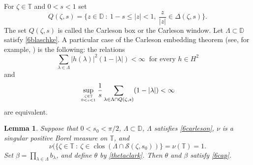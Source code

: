 \documentclass[a4paper,oneside,11pt]{amsart}
\numberwithin{equation}{section}
\theoremstyle{plain}
\newtheorem{lemma}[theorem]{Lemma}
\theoremstyle{definition}
\begin{document}
For $\zeta\in\mathbb T$ and  $0<s<1$ set
\begin{equation*} Q(\zeta, s)=\{z\in\mathbb D\ :\ 1-s\leq |z|<1, \ \frac{z}{|z|}\in\Delta(\zeta, s)\}.
\end{equation*} 
The set $Q(\zeta, s)$ is called the Carleson box or the Carleson window. Let $\Lambda\subset\mathbb D$ satisfy \eqref{6blaschke}.
A particular case of the Carleson embedding theorem 
(see, for example, {\cite[Theorem 11.22]{gmr}}) is the following: the relations 
\begin{equation} \label{6carleson} \sum_{\lambda\in\Lambda} |h(\lambda)|^2(1-|\lambda|)<\infty \ \text{ for every }h\in H^2
\end{equation}
and 
\begin{equation} \label{6carlesonqq} 
\sup_{\zeta\in\mathbb T\atop 0<s<1}\frac{1}{s}\sum_{\lambda\in\Lambda\cap Q(\zeta, s)} (1-|\lambda|)<\infty
\end{equation}
are equivalent. 


\begin{lemma}\label{lem61} Suppose that $0<s_0<\pi/2$,  $\Lambda\subset\mathbb D$, $\Lambda$ satisfies \eqref{6carleson}, 
$\nu$ is a singular positive Borel measure on $\mathbb T$,
and 
\begin{equation*}
\nu(\{\zeta\in\mathbb T\ :\ \zeta\in\operatorname{clos}(\Lambda\cap\mathcal S(\zeta,s_0))\}= \nu(\mathbb T)=1.
\end{equation*}
Set $\beta=\prod_{\lambda\in\Lambda}b_\lambda$, and define $\theta$ by \eqref{thetaclark}. Then $\theta$ and $\beta$ satisfy \eqref{6cap}.
\end{lemma}
\end{document}
